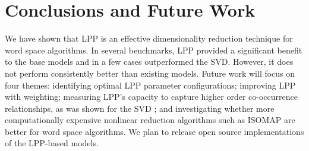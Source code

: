 \documentclass[11pt]{article}
\begin{document}
\section{Conclusions and Future Work}

We have shown that LPP is an effective dimensionality reduction technique for
word space algorithms.  In several benchmarks, LPP provided a significant
benefit to the base models and in a few cases outperformed the SVD.  However, it
does not perform consistently better than existing models.  Future work will
focus on four themes: identifying optimal LPP parameter configurations;
improving LPP with weighting; measuring LPP's capacity to capture higher order
co-occurrence relationships, as was shown for the SVD \cite{lemaire06effects};
and investigating whether more computationally expensive nonlinear reduction
algorithms such as ISOMAP \cite{tenenbaum00global} are better for word space
algorithms.  We plan to release open source implementations of the LPP-based
models.



\end{document}
